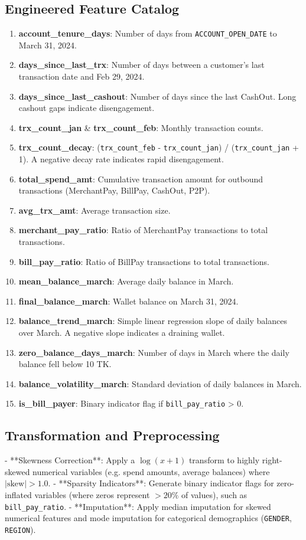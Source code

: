 \documentclass[11pt,a4paper]{article}
\begin{document}
\subsection{Engineered Feature Catalog}
\begin{enumerate}
    \item \textbf{account\_tenure\_days}: Number of days from \texttt{ACCOUNT\_OPEN\_DATE} to March 31, 2024.
    \item \textbf{days\_since\_last\_trx}: Number of days between a customer's last transaction date and Feb 29, 2024.
    \item \textbf{days\_since\_last\_cashout}: Number of days since the last CashOut. Long cashout gaps indicate disengagement.
    \item \textbf{trx\_count\_jan} \& \textbf{trx\_count\_feb}: Monthly transaction counts.
    \item \textbf{trx\_count\_decay}: (\texttt{trx\_count\_feb} - \texttt{trx\_count\_jan}) / (\texttt{trx\_count\_jan} + 1). A negative decay rate indicates rapid disengagement.
    \item \textbf{total\_spend\_amt}: Cumulative transaction amount for outbound transactions (MerchantPay, BillPay, CashOut, P2P).
    \item \textbf{avg\_trx\_amt}: Average transaction size.
    \item \textbf{merchant\_pay\_ratio}: Ratio of MerchantPay transactions to total transactions.
    \item \textbf{bill\_pay\_ratio}: Ratio of BillPay transactions to total transactions.
    \item \textbf{mean\_balance\_march}: Average daily balance in March.
    \item \textbf{final\_balance\_march}: Wallet balance on March 31, 2024.
    \item \textbf{balance\_trend\_march}: Simple linear regression slope of daily balances over March. A negative slope indicates a draining wallet.
    \item \textbf{zero\_balance\_days\_march}: Number of days in March where the daily balance fell below 10 TK.
    \item \textbf{balance\_volatility\_march}: Standard deviation of daily balances in March.
    \item \textbf{is\_bill\_payer}: Binary indicator flag if \texttt{bill\_pay\_ratio} > 0.
\end{enumerate}

\subsection{Transformation and Preprocessing}
- **Skewness Correction**: Apply a $\log(x + 1)$ transform to highly right-skewed numerical variables (e.g. spend amounts, average balances) where $|\text{skew}| > 1.0$.
- **Sparsity Indicators**: Generate binary indicator flags for zero-inflated variables (where zeros represent $>20\%$ of values), such as \texttt{bill\_pay\_ratio}.
- **Imputation**: Apply median imputation for skewed numerical features and mode imputation for categorical demographics (\texttt{GENDER}, \texttt{REGION}).
\end{document}

